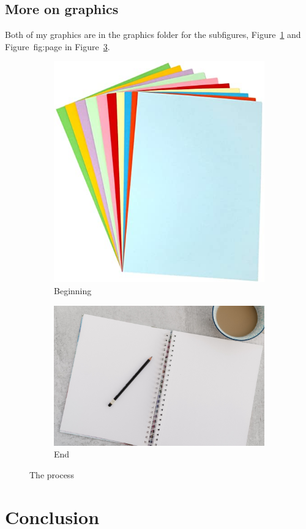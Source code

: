 \documentclass{proc}
\begin{document}
\subsection{More on graphics}

Both of my graphics are in the graphics folder for the subfigures, Figure~\ref{fig:paper} and Figure~{fig:page} in Figure~\ref{fig:subs}.

\begin{figure}
\centering
	\begin{subfigure}[b]{0.2\textwidth}
		\centering
		\includegraphics[scale=0.2]{paper.jpg}
		\caption{Beginning}
		\label{fig:paper}
	\end{subfigure}
	\begin{subfigure}[b]{0.2\textwidth}
		\centering
		\includegraphics[scale=0.03]{page.jpeg}
		\caption{End}
		\label{fig:page}
	\end{subfigure}
\caption{The process}
\label{fig:subs}
\end{figure}
	
	
\section{Conclusion}
	
	
\end{document}
